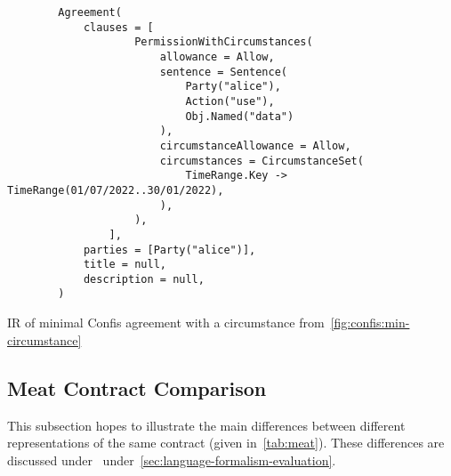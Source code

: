 \begin{code}
    \begin{verbatim}
        Agreement(
            clauses = [
                    PermissionWithCircumstances(
                        allowance = Allow,
                        sentence = Sentence(
                            Party("alice"),
                            Action("use"),
                            Obj.Named("data")
                        ),
                        circumstanceAllowance = Allow,
                        circumstances = CircumstanceSet(
                            TimeRange.Key -> TimeRange(01/07/2022..30/01/2022),
                        ),
                    ),
                ],
            parties = [Party("alice")],
            title = null,
            description = null,
        )
    \end{verbatim}
    \caption{IR of minimal Confis agreement with a circumstance from~\autoref{fig:confis:min-circumstance}}
    \label{fig:confis:min-circumstance-ir}
\end{code}


\subsection{Meat Contract Comparison}\label{subsec:meat-contract-comparison}

This subsection hopes to illustrate the main differences between different representations of the same contract (given in~\autoref{tab:meat}).
These differences are discussed under~ under~\autoref{sec:language-formalism-evaluation}.

